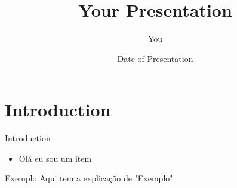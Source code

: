 \documentclass{beamer}	%
\title[Your Short Title]{Your Presentation}
\author{You}
\institute{Where You're From}
\date{Date of Presentation}
\begin{document}
\begin{frame}
  \titlepage
\end{frame}

\section{Introduction}

\begin{frame}{Introduction}

\begin{itemize}
  \item Olá eu sou um item
\end{itemize}

\begin{block}{Exemplo}
Aqui tem a explicação de "Exemplo"
\end{block}

\end{frame}
\end{document}
